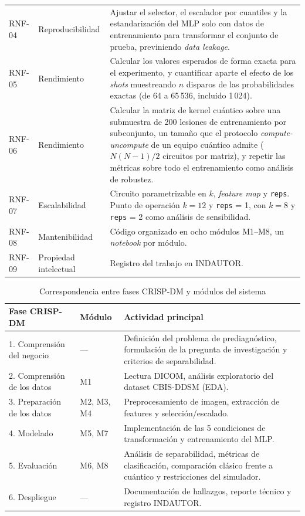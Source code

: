 \begin{longtable}{@{}llp{9.5cm}@{}}
RNF-04 & Reproducibilidad &
Ajustar el selector, el escalador por cuantiles y la
estandarización del MLP solo con datos de entrenamiento para
transformar el conjunto de prueba, previniendo \textit{data leakage}. \\

RNF-05 & Rendimiento &
Calcular los valores esperados de forma exacta para el
experimento, y cuantificar aparte el efecto de los
\textit{shots} muestreando $n$ disparos de las probabilidades
exactas (de 64 a 65\,536, incluido 1\,024). \\

RNF-06 & Rendimiento &
Calcular la matriz de kernel cuántico sobre una submuestra de
200 lesiones de entrenamiento por subconjunto, un tamaño que el
protocolo \textit{compute-uncompute} de un equipo cuántico
admite ($N(N-1)/2$ circuitos por matriz), y repetir las métricas
sobre todo el entrenamiento como análisis de robustez. \\

RNF-07 & Escalabilidad &
Circuito parametrizable en $k$, \textit{feature map} y
\texttt{reps}. Punto de operación $k = 12$ y \texttt{reps} = 1,
con $k = 8$ y \texttt{reps} = 2 como análisis de sensibilidad. \\

RNF-08 & Mantenibilidad &
Código organizado en ocho módulos M1--M8, un \textit{notebook}
por módulo. \\

RNF-09 & Propiedad intelectual &
Registro del trabajo en INDAUTOR. \\

\end{longtable}
\endgroup

\begin{table}[H]
\centering
\caption{Correspondencia entre fases CRISP-DM y módulos
         del sistema}
\label{tab:crisp_modulos}
\renewcommand{\arraystretch}{1.3}
\begin{tabularx}{\textwidth}{@{}llX@{}}
\toprule
\textbf{Fase CRISP-DM} & \textbf{Módulo} &
\textbf{Actividad principal} \\
\midrule
1. Comprensión del negocio  &
  ---   &
  Definición del problema de prediagnóstico,
  formulación de la pregunta de investigación
  y criterios de separabilidad. \\
2. Comprensión de los datos &
  M1    &
  Lectura DICOM, análisis exploratorio del
  dataset CBIS-DDSM (EDA). \\
3. Preparación de los datos &
  M2, M3, M4 &
  Preprocesamiento de imagen, extracción de
  features y selección/escalado. \\
4. Modelado &
  M5, M7 &
  Implementación de las 5 condiciones de
  transformación y entrenamiento del MLP. \\
5. Evaluación &
  M6, M8 &
  Análisis de separabilidad, métricas de
  clasificación, comparación clásico frente a
  cuántico y restricciones del simulador. \\
6. Despliegue &
  ---   &
  Documentación de hallazgos, reporte técnico
  y registro INDAUTOR. \\
\bottomrule
\end{tabularx}
\end{table}
